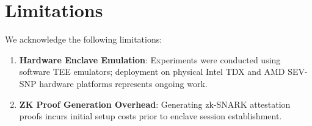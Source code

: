 \section{Limitations}
\label{sec:limitations}

We acknowledge the following limitations:
\begin{enumerate}
    \item \textbf{Hardware Enclave Emulation}: Experiments were conducted using software TEE emulators; deployment on physical Intel TDX and AMD SEV-SNP hardware platforms represents ongoing work.
    \item \textbf{ZK Proof Generation Overhead}: Generating zk-SNARK attestation proofs incurs initial setup costs prior to enclave session establishment.
\end{enumerate}
